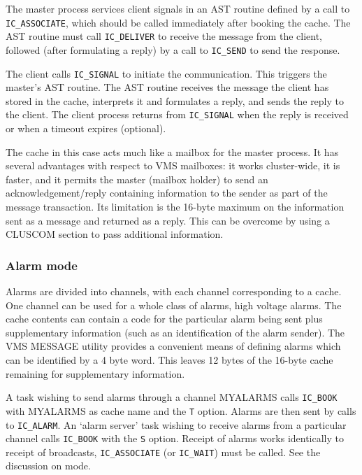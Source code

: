   The master process services client signals in an AST routine
  defined by a call to \verb|IC_ASSOCIATE|, which should be called
  immediately after booking the cache.
  The AST routine must call \verb|IC_DELIVER|
  to receive the message from the client, followed
  (after formulating a reply) by a call to
  \verb|IC_SEND| to send the response.

  The client calls \verb|IC_SIGNAL| to initiate the communication. This
  triggers the master's AST routine. The AST routine
  receives the message the client has stored in the cache, interprets
  it and formulates a reply, and sends the reply to the client.
  The client process returns from \verb|IC_SIGNAL| when the reply is
  received or when a timeout expires (optional).

  The cache in this case acts much like a mailbox for the master
  process. It has several advantages with respect to VMS mailboxes:
  it works cluster-wide, it is faster, and it permits the master (mailbox
  holder) to send an acknowledgement/reply containing information
  to the sender as part of the message transaction. Its limitation
  is the 16-byte maximum on the information sent as a message and
  returned as a reply. This can be overcome by using a CLUSCOM section
  to pass additional information.

\subsubsection{Alarm mode}
Alarms are divided into channels, with each channel corresponding to a
cache. One channel can be used for a whole class of alarms, \eg high
voltage alarms. The cache contents can contain a code for the particular
alarm being sent plus supplementary information (such as an identification
of the alarm sender). The VMS MESSAGE utility provides a convenient means of
defining alarms which can be identified by a 4 byte word. This leaves
12 bytes of the 16-byte cache remaining for supplementary information.

A task wishing to send alarms through a channel MYALARMS calls
\verb|IC_BOOK| with MYALARMS as cache name and the {\tt T} option.
Alarms are then sent by calls to \verb|IC_ALARM|.
An `alarm server' task wishing to receive alarms from a particular channel
calls \verb|IC_BOOK| with the {\tt S} option. 
Receipt of alarms works identically to receipt of broadcasts, \ie 
\verb|IC_ASSOCIATE| (or \verb|IC_WAIT|) must be called. See the
discussion on \broadcast mode.

